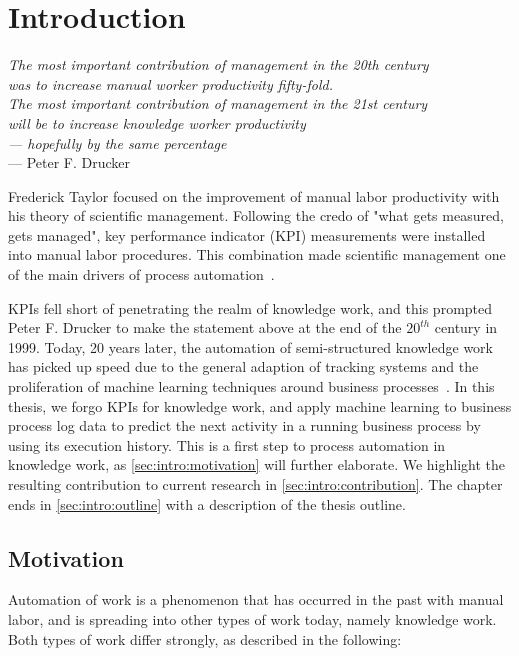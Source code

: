 \chapter{Introduction}\label{sec:intro}
\begin{flushright}{\slshape
The most important contribution of management in the 20th century\\
was to increase manual worker productivity fifty-fold.\\
The most important contribution of management in the 21st century\\
will be to increase knowledge worker productivity\\
— hopefully by the same percentage} \\ \medskip
--- Peter F. Drucker~\cite{drucker1999}
\end{flushright}

\noindent Frederick Taylor focused on the improvement of manual labor productivity with his theory of scientific management. Following the credo of "what gets measured, gets managed", key performance indicator (KPI) measurements were installed into manual labor procedures. This combination made scientific management one of the main drivers of process automation~\cite{web:taylorism-and-drucker}.

KPIs fell short of penetrating the realm of knowledge work, and this prompted Peter F. Drucker to make the statement above at the end of the $20^{th}$ century in 1999. Today, 20 years later, the automation of semi-structured knowledge work has picked up speed due to the general adaption of tracking systems and the proliferation of machine learning techniques around business processes~\cite{boehmer2018probability, klinkmuller2018reliablemonitoring}.
In this thesis, we forgo KPIs for knowledge work, and apply machine learning to business process log data to predict the next activity in a running business process by using its execution history. This is a first step to process automation in knowledge work, as \autoref{sec:intro:motivation} will further elaborate.  We highlight the resulting contribution to current research in \autoref{sec:intro:contribution}. The chapter ends in \autoref{sec:intro:outline} with a description of the thesis outline.

\section{Motivation} \label{sec:intro:motivation}
Automation of work is a phenomenon that has occurred in the past with manual labor, and is spreading into other types of work today, namely knowledge work. Both types of work differ strongly, as described in the following:

